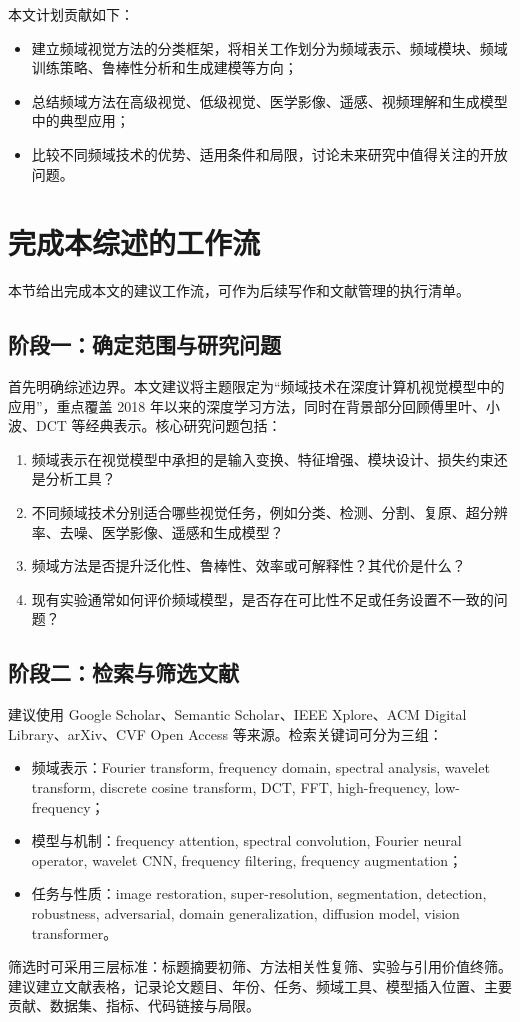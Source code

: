 \documentclass[journal,10pt]{IEEEtran}
\begin{document}
本文计划贡献如下：
\begin{itemize}[leftmargin=*]
    \item 建立频域视觉方法的分类框架，将相关工作划分为频域表示、频域模块、频域训练策略、鲁棒性分析和生成建模等方向；
    \item 总结频域方法在高级视觉、低级视觉、医学影像、遥感、视频理解和生成模型中的典型应用；
    \item 比较不同频域技术的优势、适用条件和局限，讨论未来研究中值得关注的开放问题。
\end{itemize}

\section{完成本综述的工作流}
本节给出完成本文的建议工作流，可作为后续写作和文献管理的执行清单。

\subsection{阶段一：确定范围与研究问题}
首先明确综述边界。本文建议将主题限定为“频域技术在深度计算机视觉模型中的应用”，重点覆盖 2018 年以来的深度学习方法，同时在背景部分回顾傅里叶、小波、DCT 等经典表示。核心研究问题包括：
\begin{enumerate}[leftmargin=*]
    \item 频域表示在视觉模型中承担的是输入变换、特征增强、模块设计、损失约束还是分析工具？
    \item 不同频域技术分别适合哪些视觉任务，例如分类、检测、分割、复原、超分辨率、去噪、医学影像、遥感和生成模型？
    \item 频域方法是否提升泛化性、鲁棒性、效率或可解释性？其代价是什么？
    \item 现有实验通常如何评价频域模型，是否存在可比性不足或任务设置不一致的问题？
\end{enumerate}

\subsection{阶段二：检索与筛选文献}
建议使用 Google Scholar、Semantic Scholar、IEEE Xplore、ACM Digital Library、arXiv、CVF Open Access 等来源。检索关键词可分为三组：
\begin{itemize}[leftmargin=*]
    \item 频域表示：Fourier transform, frequency domain, spectral analysis, wavelet transform, discrete cosine transform, DCT, FFT, high-frequency, low-frequency；
    \item 模型与机制：frequency attention, spectral convolution, Fourier neural operator, wavelet CNN, frequency filtering, frequency augmentation；
    \item 任务与性质：image restoration, super-resolution, segmentation, detection, robustness, adversarial, domain generalization, diffusion model, vision transformer。
\end{itemize}
筛选时可采用三层标准：标题摘要初筛、方法相关性复筛、实验与引用价值终筛。建议建立文献表格，记录论文题目、年份、任务、频域工具、模型插入位置、主要贡献、数据集、指标、代码链接与局限。
\end{document}
